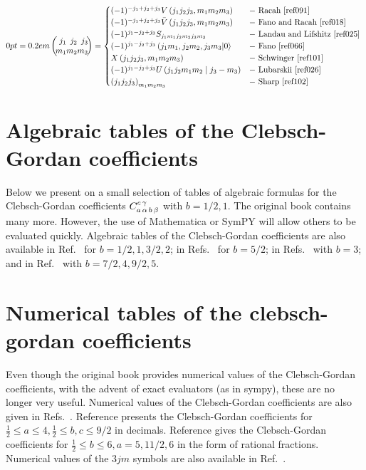 \[
\threej{j_{1}}{j_{2}}{j_{3}}{m_{1}}{m_{2}}{m_{3}}= \begin{cases}(-1)^{-j_{1}+j_{2}+j_{3}} V\left(j_{1} j_{2} j_{3}, m_{1} m_{2} m_{3}\right) & - \text { Racah \cite{ref091}} \\
(-1)^{-j_{1}+j_{2}+j_{3}} \bar{V}\left(j_{1} j_{2} j_{3}, m_{1} m_{2} m_{3}\right) & - \text { Fano and Racah \cite{ref018} } \\
(-1)^{j_{1}-j_{2}+j_{3}} S_{j_{1} m_{1} j_{2} m_{2} j_{3} m_{3}} & - \text { Landau and Lifshitz \cite{ref025} } \\
(-1)^{j_{1}-j_{2}+j_{3}}\left(j_{1} m_{1}, j_{2} m_{2}, j_{3} m_{3}\middle|0\right\rangle & - \text { Fano \cite{ref066} } \\
X\left(j_{1} j_{2} j_{3}, m_{1} m_{2} m_{3}\right) & - \text { Schwinger \cite{ref101} } \\
(-1)^{j_{1}-j_{2}+j_{3}} U\left(j_{1} j_{2} m_{1} m_{2} \mid j_{3}-m_{3}\right) & - \text { Lubarskii \cite{ref026} } \\
\left(j_{1} j_{2} j_{3}\right)_{m_{1} m_{2} m_{3}} & - \text { Sharp \cite{ref102} }\end{cases}
\]
\section{Algebraic tables of the Clebsch-Gordan coefficients}\label{sec:8.12}
Below we present on a small selection of tables of algebraic formulas for the Clebsch-Gordan coefficients $C_{a\,\alpha\,b\,\beta}^{c\,\gamma}$ with $b=1 / 2,1$. The original book contains many more. However, the use of Mathematica or SymPY will allow others to be evaluated quickly.
Algebraic tables of the Clebsch-Gordan coefficients are also available in Ref.~\cite{ref010} for $b=1 / 2,1,3 / 2,2$; in Refs.~\cite{ref121,ref125} for $b=5 / 2$; in Refs.~\cite{ref117,ref130} with $b=3$; and in Ref.~\cite{ref126} with $b=7 / 2,4,9 / 2,5$.

\section{Numerical tables of the clebsch-gordan coefficients}\label{sec:8.13}
Even though the original book provides numerical values of the Clebsch-Gordan coefficients, with the advent of exact evaluators (as in sympy), these are no longer very useful.
Numerical values of the Clebsch-Gordan coefficients are also given in Refs.~\cite{ref126, ref127}. Reference \cite{ref127} presents the Clebsch-Gordan coefficients for $\frac{1}{2} \leq a \leq 4, \frac{1}{2} \leq b, c \leq 9 / 2$ in decimals. Reference \cite{ref126} gives the Clebsch-Gordan coefficients for $\frac{1}{2} \leq b \leq 6, a=5,11 / 2,6$ in the form of rational fractions. Numerical values of the $3 j m$ symbols are also available in Ref.~\cite{ref113}.

